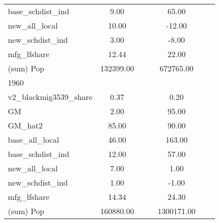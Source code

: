 \begin{table}[htbp]
\begin{tabular}{l*{2}{ccc}}
base\_schdist\_ind    &        9.00&            &            &       65.00&            &            \\
new\_all\_local       &       10.00&            &            &      -12.00&            &            \\
new\_schdist\_ind     &        3.00&            &            &       -8.00&            &            \\
mfg\_lfshare         &       12.44&            &            &       22.00&            &            \\
(sum) Pop           &   132399.00&            &            &   672765.00&            &            \\
\midrule
1960                &            &            &            &            &            &            \\
v2\_blackmig3539\_share&        0.37&            &            &        0.20&            &            \\
GM                  &        2.00&            &            &       95.00&            &            \\
GM\_hat2             &       85.00&            &            &       90.00&            &            \\
base\_all\_local      &       46.00&            &            &      163.00&            &            \\
base\_schdist\_ind    &       12.00&            &            &       57.00&            &            \\
new\_all\_local       &        7.00&            &            &        1.00&            &            \\
new\_schdist\_ind     &        1.00&            &            &       -1.00&            &            \\
mfg\_lfshare         &       14.34&            &            &       24.30&            &            \\
(sum) Pop           &   160880.00&            &            &  1300171.00&            &            \\
\bottomrule
\end{tabular}
\end{table}
